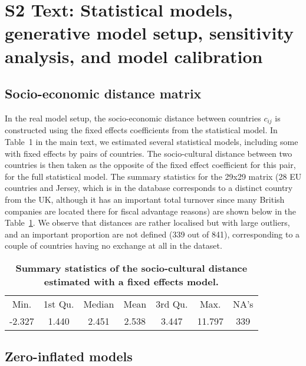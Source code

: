 

\renewcommand{\thetable}{S2-\Alph{table}}


\vspace*{0.35in}
\justify

\section*{S2 Text: Statistical models, generative model setup, sensitivity analysis, and model calibration}


\subsection*{Socio-economic distance matrix}

In the real model setup, the socio-economic distance between countries $c_{ij}$ is constructed using the fixed effects coefficients from the statistical model. In Table~1 in the main text, we estimated several statistical models, including some with fixed effects by pairs of countries. The socio-cultural distance between two countries is then taken as the opposite of the fixed effect coefficient for this pair, for the full statistical model. The summary statistics for the 29x29 matrix (28 EU countries and Jersey, which is in the database corresponds to a distinct country from the UK, although it has an important total turnover since many British companies are located there for fiscal advantage reasons) are shown below in the Table~\ref{tab:fixedeff}. We observe that distances are rather localised but with large outliers, and an important proportion are not defined (339 out of 841), corresponding to a couple of countries having no exchange at all in the dataset.

\begin{table}[h!]
\caption{\textbf{Summary statistics of the socio-cultural distance estimated with a fixed effects model.}\label{tab:fixedeff}}
\begin{tabular}{ccccccc}
   Min. & 1st Qu. &  Median &  Mean &  3rd Qu. &  Max. &  NA's \\
 -2.327 &  1.440 &  2.451 &  2.538 &  3.447 & 11.797 &  339 
\end{tabular}
\end{table}



\subsection*{Zero-inflated models}

